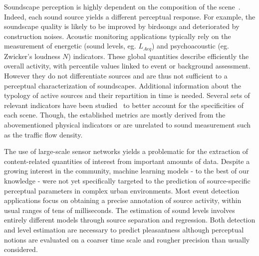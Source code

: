 \documentclass{article}
\begin{document}
\begin{sloppy}
Soundscape perception is highly dependent on the composition of the scene~\cite{lavandier2006, nilsson2006}. Indeed, each sound source yields a different perceptual response. For example, the soundscape quality is likely to be improved by birdsongs and deteriorated by construction noises. Acoustic monitoring applications typically rely on the measurement of energetic (sound levels, eg. $L_{Aeq}$) and psychoacoustic (eg. Zwicker's loudness $N$) indicators. These global quantities describe efficiently the overall activity, with percentile values linked to event or background assessment. However they do not differentiate sources and are thus not sufficient to a perceptual characterization of soundscapes. Additional information about the typology of active sources and their repartition in time is needed. Several sets of relevant indicators have been studied~\cite{can2008, can2016, brocolini2013} to better account for the specificities of each scene. Though, the established metrics are mostly derived from the abovementioned physical indicators or are unrelated to sound measurement such as the traffic flow density.

The use of large-scale sensor networks yields a problematic for the extraction of content-related quantities of interest from important amounts of data. Despite a growing interest in the community, machine learning models - to the best of our knowledge - were not yet specifically targeted to the prediction of source-specific perceptual parameters in complex urban environments. Most event detection applications focus on obtaining a precise annotation of source activity, within usual ranges of tens of milliseconds. The estimation of sound levels involves entirely different models through source separation and regression. Both detection and level estimation are necessary to predict pleasantness although perceptual notions are evaluated on a coarser time scale and rougher precision than usually considered. 




\end{sloppy}
\end{document}
